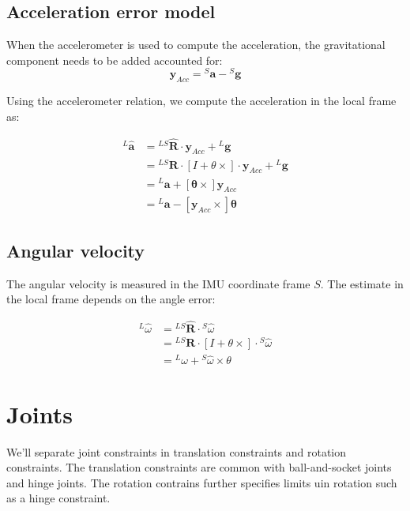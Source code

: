 \documentclass{article}
\begin{document}
\subsection{Acceleration error model}
When the accelerometer is used to compute the acceleration, the gravitational component needs to be added accounted for:
\begin{equation} \label{eq:accelerometer_signal}
\boldsymbol{y}_{Acc} = {}^S\boldsymbol{a} - {}^S\boldsymbol{g}
\end{equation}


Using the accelerometer relation, we compute the acceleration in the local frame as:

\begin{equation} \label{eq:acceleration_estimate}
\begin{aligned}
{}^L\hat{\boldsymbol{a}} &= {}^{LS}\hat{\boldsymbol{R}} \cdot \boldsymbol{y}_{Acc} + {}^L\boldsymbol{g} \\
&= {}^{LS}\boldsymbol{R} \cdot \left[ I + \theta\times  \right] \cdot \boldsymbol{y}_{Acc} + {}^L\boldsymbol{g} \\
&= {}^L\boldsymbol{a} + \left[ \boldsymbol{\theta}\times  \right] \boldsymbol{y}_{Acc} \\
&= {}^L\boldsymbol{a} - \left[ \boldsymbol{y}_{Acc} \times  \right] \boldsymbol{\theta}
\end{aligned}
\end{equation}

\subsection{Angular velocity}
The angular velocity is measured in the IMU coordinate frame $S$. The estimate in the local frame depends on the angle error:

\begin{equation} \label{eq:angular_velocity_estimate}
\begin{aligned}
{}^{L}\hat{\omega} &= {}^{LS}\hat{\boldsymbol{R}} \cdot {}^{S}\hat{\omega}  \\
&= {}^{LS}\boldsymbol{R} \cdot \left[ I + \theta\times  \right] \cdot {}^{S}\hat{\omega}  \\
&= {}^{L}{\omega} + {}^{S}\hat{\omega} \times \theta
\end{aligned}
\end{equation}


\section{Joints}
We'll separate joint constraints in translation constraints and rotation constraints. The translation constraints are common with ball-and-socket joints and hinge joints. The rotation contrains further specifies limits uin rotation such as a hinge constraint.
\end{document}

